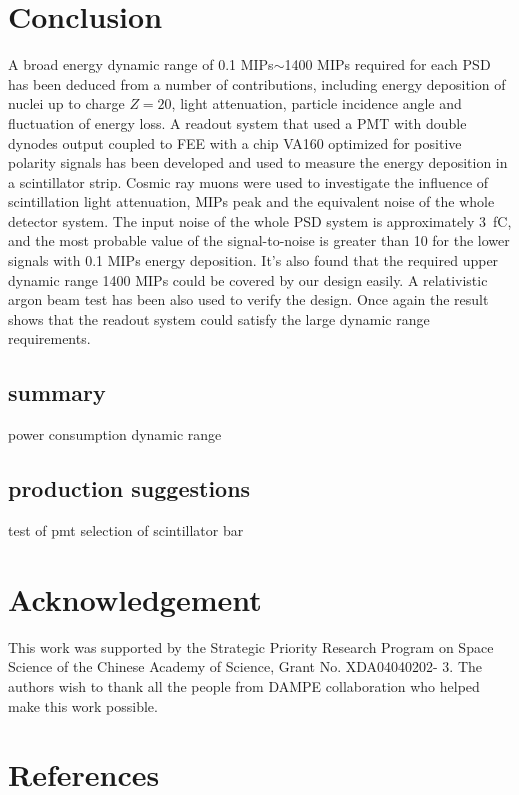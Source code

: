 \documentclass[5p, times]{elsarticle}
\begin{document}
\section{Conclusion}
\label{sec:conclustion}

A broad energy dynamic range of 0.1 MIPs$\sim$1400 MIPs required for each PSD has been deduced from a number of contributions, including energy deposition of nuclei up to charge $Z=20$, light attenuation, particle incidence angle and fluctuation of energy loss. 
A readout system that used a PMT with double dynodes output coupled to FEE with a chip VA160 optimized for positive polarity signals has been developed and used to measure the energy deposition in a scintillator strip. 
Cosmic ray muons were used to investigate the influence of scintillation light attenuation, MIPs peak and the equivalent noise of the whole detector system. 
The input noise of the whole PSD system is approximately \SI{3}{\femto\coulomb}, and the most probable value of the signal-to-noise is greater than 10 for the lower signals with 0.1 MIPs energy deposition. 
It’s also found that the required upper dynamic range 1400 MIPs could be covered by our design easily. 
A relativistic argon beam test has been also used to verify the design. 
Once again the result shows that the readout system could satisfy the large dynamic range requirements.

\subsection{summary}
power consumption
dynamic range

\subsection{production suggestions}
test of pmt
selection of scintillator bar

\section*{Acknowledgement}
\label{sec:acknowledgement}

This work was supported by the Strategic Priority Research Program on Space Science of the Chinese Academy of Science,
Grant No. XDA04040202- 3. The authors wish to thank all the people from DAMPE collaboration who helped make this work
possible.

\section*{References}
\label{sec:reference}



\end{document}

